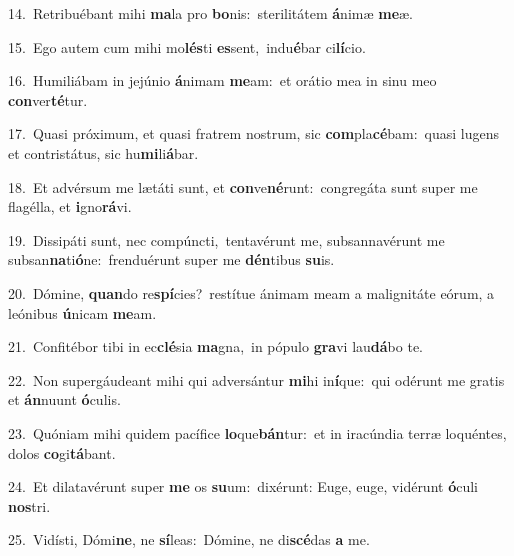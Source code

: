 {\numbfont\textcolor{\numbcolor}{14.}}~Retribuébant mihi \textbf{ma}\-la pro \textbf{bo}\-nis:~\star sterilitátem \textbf{á}\-nimæ \textbf{me}\-æ.\par
{\numbfont\textcolor{\numbcolor}{15.}}~Ego autem cum mihi mo\-\textbf{lés}\-ti \textbf{es}\-sent,~\star indu\-\textbf{é}\-bar ci\-\textbf{lí}\-cio.\par
{\numbfont\textcolor{\numbcolor}{16.}}~Humiliábam in jejúnio \textbf{á}\-nimam \textbf{me}\-am:~\star et orátio mea in sinu meo \textbf{con}\-ver\-\textbf{té}\-tur.\par
{\numbfont\textcolor{\numbcolor}{17.}}~Quasi próximum, et quasi fratrem nostrum, sic \textbf{com}\-pla\-\textbf{cé}\-bam:~\star quasi lugens et contristátus, sic hu\-\textbf{mi}\-li\-\textbf{á}\-bar.\par
{\numbfont\textcolor{\numbcolor}{18.}}~Et advérsum me lætáti sunt, et \textbf{con}\-ve\-\textbf{né}\-runt:~\star congregáta sunt super me flagélla, et \textbf{i}\-gno\-\textbf{rá}\-vi.\par
{\numbfont\textcolor{\numbcolor}{19.}}~Dissipáti sunt, nec compúncti,~\dagger tentavérunt me, subsannavérunt me subsan\-\textbf{na}\-ti\-\textbf{ó}\-ne:~\star frenduérunt super me \textbf{dén}\-tibus \textbf{su}\-is.\par
{\numbfont\textcolor{\numbcolor}{20.}}~Dómine, \textbf{quan}\-do re\-\textbf{spí}\-cies?~\star restítue ánimam meam a malignitáte eórum, a leónibus \textbf{ú}\-nicam \textbf{me}\-am.\par
{\numbfont\textcolor{\numbcolor}{21.}}~Confitébor tibi in ec\-\textbf{clé}\-sia \textbf{ma}\-gna,~\star in pópulo \textbf{gra}\-vi lau\-\textbf{dá}\-bo te.\par
{\numbfont\textcolor{\numbcolor}{22.}}~Non supergáudeant mihi qui adversántur \textbf{mi}\-hi in\-\textbf{í}\-que:~\star qui odérunt me gratis et \textbf{án}\-nuunt \textbf{ó}\-culis.\par
{\numbfont\textcolor{\numbcolor}{23.}}~Quóniam mihi quidem pacífice \textbf{lo}\-que\-\textbf{bán}\-tur:~\star et in iracúndia terræ loquéntes, dolos \textbf{co}\-gi\-\textbf{tá}\-bant.\par
{\numbfont\textcolor{\numbcolor}{24.}}~Et dilatavérunt super \textbf{me} os \textbf{su}\-um:~\star dixérunt: Euge, euge, vidérunt \textbf{ó}\-culi \textbf{nos}\-tri.\par
{\numbfont\textcolor{\numbcolor}{25.}}~Vidísti, Dómi\-\textbf{ne}\-, ne \textbf{sí}\-leas:~\star Dómine, ne di\-\textbf{scé}\-das \textbf{a} me.\par

